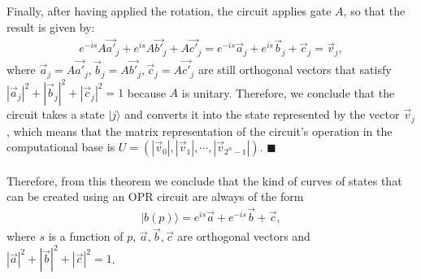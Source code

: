 \documentclass[10pt,letterpaper]{article} %
\begin{document}
Finally, after having applied the rotation, the circuit applies gate $A$, 
so that the result is given by:
\begin{eqnarray}
e^{-is} A \vec{a'}_j + e^{is} A \vec{b'}_j + A \vec{c'}_j = e^{-is} \vec{a}_j + e^{is} \vec{b}_j + \vec{c}_j = \vec{v}_j,
\end{eqnarray}
where $\vec{a}_j = A \vec{a'}_j , \vec{b}_j = A \vec{b'}_j , \vec{c}_j = A \vec{c'}_j$ are still orthogonal
vectors that satisfy $|\vec{a}_j|^2 + |\vec{b}_j|^2 + |\vec{c}_j|^2 = 1$ because $A$ is unitary. 
Therefore, we conclude that the circuit takes a state $|j\rangle$ and converts it
 into the state represented by the vector $\vec{v}_j$, which means that the matrix representation of the circuit's operation in the 
computational base is
 $U = (|\vec{v}_0|, |\vec{v}_1|, \cdots, |\vec{v}_{2^n-1}|)$. $\blacksquare$  \\
 $\;$ \\
 
Therefore, from this theorem we conclude that
the kind of curves of states that can be created
using an OPR circuit are always of the form
\begin{align*}
|b(p)\rangle= e^{is} \vec{a} + e^{-is} \vec{b} + \vec{c},
\end{align*}
where $s$ is a function of $p$, $\vec{a},\vec{b},\vec{c}$ are orthogonal vectors and
$|\vec{a}|^2+  |\vec{b}|^2 + |\vec{c}|^2 = 1$.
\newpage
\end{document}
